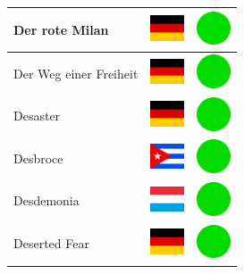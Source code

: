 \documentclass[12pt, a4paper, twoside]{report}
\begin{document}
\begin{center}
\begin{longtable}{|p{5cm}|p{2cm}|p{2cm}|}
 Der rote Milan                                             & \includegraphics[width=1cm]{../img/flags/de} &   \includegraphics[width=1cm]{../likes/y} \\ \hline
 Der Weg einer Freiheit                                     & \includegraphics[width=1cm]{../img/flags/de} &   \includegraphics[width=1cm]{../likes/y} \\ \hline
 Desaster                                                   & \includegraphics[width=1cm]{../img/flags/de} &   \includegraphics[width=1cm]{../likes/y} \\ \hline
 Desbroce                                                   & \includegraphics[width=1cm]{../img/flags/cu} &   \includegraphics[width=1cm]{../likes/y} \\ \hline
 Desdemonia                                                 & \includegraphics[width=1cm]{../img/flags/lu} &   \includegraphics[width=1cm]{../likes/y} \\ \hline
 Deserted Fear                                              & \includegraphics[width=1cm]{../img/flags/de} &   \includegraphics[width=1cm]{../likes/y} \\ \hline

\end{longtable}
\end{center}
\end{document}
